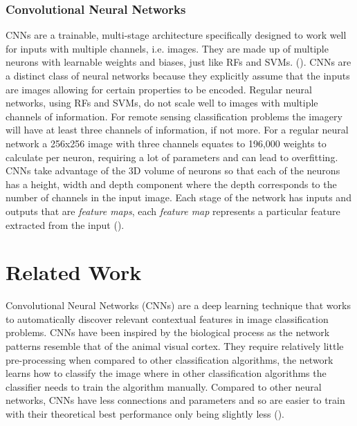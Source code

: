 \subsubsection{Convolutional Neural Networks}
CNNs are a trainable, multi-stage architecture specifically designed to work well for inputs with multiple channels, i.e. images. They are made up of multiple neurons with learnable weights and biases, just like RFs and SVMs.  (\cite{Karpathy1}). CNNs are a distinct class of neural networks because they explicitly assume that the inputs are images allowing for certain properties to be encoded. Regular neural networks, using RFs and SVMs, do not scale well to images with multiple channels of information. For remote sensing classification problems the imagery will have at least three channels of information, if not more. For a regular neural network a 256x256 image with three channels equates to 196,000 weights to calculate per neuron, requiring a lot of parameters and can lead to overfitting. CNNs take advantage of the 3D volume of neurons so that each of the neurons has a height, width and depth component where the depth corresponds to the number of channels in the input image. Each stage of the network has inputs and outputs that are \textit{feature maps}, each \textit{feature map} represents a particular feature extracted from the input (\cite{lecun10}).

\section{Related Work}
Convolutional Neural Networks (CNNs) are a deep learning technique that works to automatically discover relevant contextual features in image classification problems.
CNNs have been inspired by the biological process as the network patterns resemble that of the animal visual cortex. They require relatively little pre-processing when compared to other classification algorithms, the network learns how to classify the image where in other classification algorithms the classifier needs to train the algorithm manually. Compared to other neural networks, CNNs have less connections and parameters and so are easier to train with their theoretical best performance only being slightly less (\cite{krizhevsky17}). 

